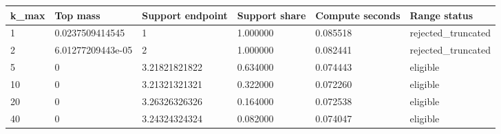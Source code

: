 \begin{tabular}{llllll}
\hline
k\_max & Top mass & Support endpoint & Support share & Compute seconds & Range status \\
\hline
1 & 0.0237509414545 & 1 & 1.000000 & 0.085518 & rejected\_truncated \\
2 & 6.01277209443e-05 & 2 & 1.000000 & 0.082441 & rejected\_truncated \\
5 & 0 & 3.21821821822 & 0.634000 & 0.074443 & eligible \\
10 & 0 & 3.21321321321 & 0.322000 & 0.072260 & eligible \\
20 & 0 & 3.26326326326 & 0.164000 & 0.072538 & eligible \\
40 & 0 & 3.24324324324 & 0.082000 & 0.074047 & eligible \\
\hline
\end{tabular}
